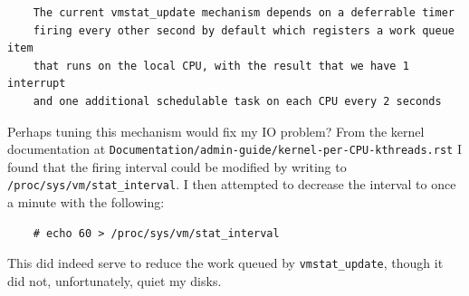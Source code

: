 \documentclass{article}
\begin{document}
\begin{verbatim}
	The current vmstat_update mechanism depends on a deferrable timer
	firing every other second by default which registers a work queue item
	that runs on the local CPU, with the result that we have 1 interrupt
	and one additional schedulable task on each CPU every 2 seconds
\end{verbatim}
Perhaps tuning this mechanism would fix my IO problem?  From the kernel documentation at \texttt{Documentation/admin-guide/kernel-per-CPU-kthreads.rst} I found that the firing interval could be modified by writing to \texttt{/proc/sys/vm/stat_interval}.  I then attempted to decrease the interval to once a minute with the following:
\begin{verbatim}
	# echo 60 > /proc/sys/vm/stat_interval
\end{verbatim}
This did indeed serve to reduce the work queued by \texttt{vmstat_update}, though it did not, unfortunately, quiet my disks.
\end{document}
